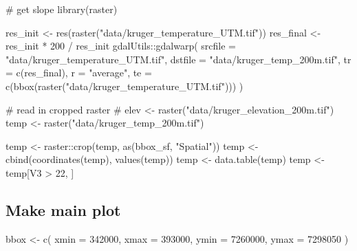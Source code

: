 \documentclass[]{article}
\newenvironment{Shaded}{}{}
\newcommand{\CommentTok}[1]{\textcolor[rgb]{0.00,0.50,0.00}{#1}}
\newcommand{\DataTypeTok}[1]{#1}
\newcommand{\DecValTok}[1]{#1}
\newcommand{\KeywordTok}[1]{\textcolor[rgb]{0.00,0.00,1.00}{#1}}
\newcommand{\NormalTok}[1]{#1}
\newcommand{\OperatorTok}[1]{#1}
\newcommand{\StringTok}[1]{\textcolor[rgb]{0.00,0.50,0.50}{#1}}
\begin{document}
\begin{Shaded}
\begin{Highlighting}[]
\CommentTok{# get slope}
\KeywordTok{library}\NormalTok{(raster)}

\NormalTok{res_init <-}\StringTok{ }\KeywordTok{res}\NormalTok{(}\KeywordTok{raster}\NormalTok{(}\StringTok{"data/kruger_temperature_UTM.tif"}\NormalTok{))}
\NormalTok{res_final <-}\StringTok{ }\NormalTok{res_init }\OperatorTok{*}\StringTok{ }\DecValTok{200} \OperatorTok{/}\StringTok{ }\NormalTok{res_init}
\NormalTok{gdalUtils}\OperatorTok{::}\KeywordTok{gdalwarp}\NormalTok{(}
  \DataTypeTok{srcfile =} \StringTok{"data/kruger_temperature_UTM.tif"}\NormalTok{,}
  \DataTypeTok{dstfile =} \StringTok{"data/kruger_temp_200m.tif"}\NormalTok{,}
  \DataTypeTok{tr =} \KeywordTok{c}\NormalTok{(res_final), }\DataTypeTok{r =} \StringTok{"average"}\NormalTok{,}
  \DataTypeTok{te =} \KeywordTok{c}\NormalTok{(}\KeywordTok{bbox}\NormalTok{(}\KeywordTok{raster}\NormalTok{(}\StringTok{"data/kruger_temperature_UTM.tif"}\NormalTok{)))}
\NormalTok{)}

\CommentTok{# read in cropped raster}
\CommentTok{# elev <- raster("data/kruger_elevation_200m.tif")}
\NormalTok{temp <-}\StringTok{ }\KeywordTok{raster}\NormalTok{(}\StringTok{"data/kruger_temp_200m.tif"}\NormalTok{)}

\NormalTok{temp <-}\StringTok{ }\NormalTok{raster}\OperatorTok{::}\KeywordTok{crop}\NormalTok{(temp, }\KeywordTok{as}\NormalTok{(bbox_sf, }\StringTok{"Spatial"}\NormalTok{))}
\NormalTok{temp <-}\StringTok{ }\KeywordTok{cbind}\NormalTok{(}\KeywordTok{coordinates}\NormalTok{(temp), }\KeywordTok{values}\NormalTok{(temp))}
\NormalTok{temp <-}\StringTok{ }\KeywordTok{data.table}\NormalTok{(temp)}
\NormalTok{temp <-}\StringTok{ }\NormalTok{temp[V3 }\OperatorTok{>}\StringTok{ }\DecValTok{22}\NormalTok{, ]}
\end{Highlighting}
\end{Shaded}

\hypertarget{make-main-plot}{%
\subsection{Make main plot}\label{make-main-plot}}

\begin{Shaded}
\begin{Highlighting}[]
\NormalTok{bbox <-}\StringTok{ }\KeywordTok{c}\NormalTok{(}
  \DataTypeTok{xmin =} \DecValTok{342000}\NormalTok{,}
  \DataTypeTok{xmax =} \DecValTok{393000}\NormalTok{,}
  \DataTypeTok{ymin =} \DecValTok{7260000}\NormalTok{,}
  \DataTypeTok{ymax =} \DecValTok{7298050}
\NormalTok{)}
\end{Highlighting}
\end{Shaded}
\end{document}
